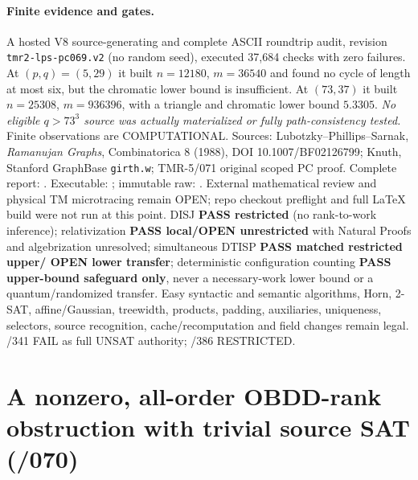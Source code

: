 \documentclass[11pt]{article}
\begin{document}
\paragraph{Finite evidence and gates.}
A hosted V8 source-generating and complete ASCII
roundtrip audit, revision
\texttt{tmr2-lps-pc069.v2} (no random seed),
executed 37,684 checks with zero failures.
At $(p,q)=(5,29)$ it built $n=12180$,
$m=36540$ and found no cycle of length at most six,
but the chromatic lower bound is insufficient.
At $(73,37)$ it built $n=25308$, $m=936396$,
with a triangle and chromatic lower bound $5.3305$.
\emph{No eligible $q>73^3$ source was actually
materialized or fully path-consistency tested.}
Finite observations are COMPUTATIONAL. Sources:
Lubotzky--Phillips--Sarnak, \emph{Ramanujan Graphs},
Combinatorica 8 (1988), DOI 10.1007/BF02126799;
Knuth, Stanford GraphBase \texttt{girth.w};
TMR-5/071 original scoped PC proof.
Complete report:
.
Executable:
;
immutable raw:
.
External mathematical review and physical TM microtracing
remain OPEN; repo checkout preflight and full LaTeX build
were not run at this point.
DISJ \textbf{PASS restricted} (no rank-to-work inference);
relativization \textbf{PASS local/OPEN unrestricted}
with Natural Proofs and algebrization unresolved;
simultaneous DTISP \textbf{PASS matched restricted upper/
OPEN lower transfer}; deterministic configuration counting
\textbf{PASS upper-bound safeguard only}, never a
necessary-work lower bound or a quantum/randomized
transfer. Easy syntactic and semantic algorithms,
Horn, 2-SAT, affine/Gaussian, treewidth, products,
padding, auxiliaries, uniqueness, selectors, source
recognition, cache/recomputation and field changes
remain legal. /341 FAIL as full UNSAT authority;
/386 RESTRICTED.

\section{A nonzero, all-order OBDD-rank obstruction with trivial source SAT (/070)}
\end{document}
